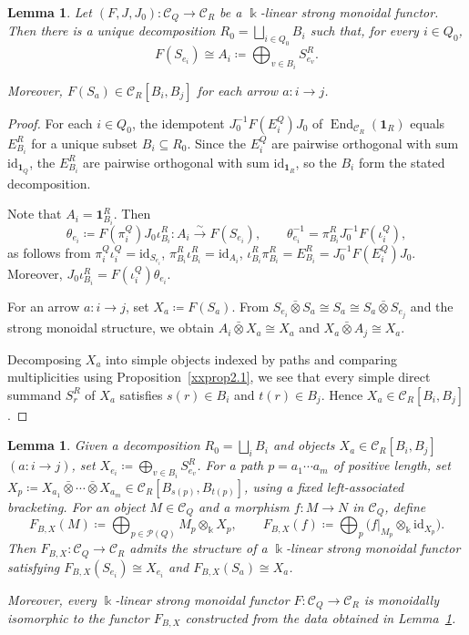 \documentclass{amsart}
\newcommand{\id}{\mathrm{id}}
\newcommand{\btensor}{\mathbin{\bar{\otimes}}}
\newtheorem{lemma}[theorem]{Lemma}
\theoremstyle{definition}
\theoremstyle{remark}
\numberwithin{equation}{section}
\begin{document}
\begin{lemma}\label{xxlem4.2}
Let
$(F,J,J_0)\colon\mathcal C_Q\longrightarrow\mathcal C_R$
be a $\Bbbk$-linear strong monoidal functor.
Then there is a unique decomposition $R_0=\bigsqcup_{i\in Q_0}B_i$
such that, for every $i\in Q_0$,
\[
F(S_{e_i})
\cong
A_i
\coloneqq
\bigoplus_{v\in B_i}S_{e_v}^R.
\]

Moreover,
$F(S_a)\in\mathcal C_R[B_i,B_j]$
for each arrow $a\colon i\to j$.

\end{lemma}

\begin{proof}
For each $i\in Q_0$, the idempotent $J_0^{-1}F(E_i^Q)J_0$ of
$\operatorname{End}_{\mathcal C_R}(\mathbf1_R)$ equals $E_{B_i}^R$ for a
unique subset $B_i\subseteq R_0$. Since the $E_i^Q$ are pairwise orthogonal
with sum $\id_{\mathbf1_Q}$, the $E_{B_i}^R$ are pairwise orthogonal with sum
$\id_{\mathbf1_R}$, so the $B_i$ form the stated decomposition.

Note that $A_i=\mathbf1_{B_i}^R$. Then
\[
\theta_{e_i}\coloneqq F(\pi_i^Q)J_0\iota_{B_i}^R
\colon A_i\xrightarrow{\sim}F(S_{e_i}),
\qquad
\theta_{e_i}^{-1}=\pi_{B_i}^R J_0^{-1}F(\iota_i^Q),
\]
as follows from $\pi_i^Q\iota_i^Q=\id_{S_{e_i}}$,
$\pi_{B_i}^R\iota_{B_i}^R=\id_{A_i}$,
$\iota_{B_i}^R\pi_{B_i}^R=E_{B_i}^R=J_0^{-1}F(E_i^Q)J_0$.
Moreover, $J_0\iota_{B_i}^R=F(\iota_i^Q)\theta_{e_i}$.

For an arrow $a\colon i\to j$, set $X_a\coloneqq F(S_a)$.
From
$S_{e_i}\btensor S_a\cong S_a\cong S_a\btensor S_{e_j}$
and the strong monoidal structure, we obtain
$A_i\btensor X_a\cong X_a$ and
$X_a\btensor A_j\cong X_a$.

Decomposing $X_a$ into simple objects indexed by paths and comparing
multiplicities using
Proposition~\ref{xxprop2.1},
we see that every simple direct summand $S_r^R$ of $X_a$ satisfies
$s(r)\in B_i$ and $t(r)\in B_j$.
Hence $X_a\in\mathcal C_R[B_i,B_j]$.
\end{proof}

\begin{lemma}\label{xxlem4.3}
Given a decomposition $R_0=\bigsqcup_iB_i$ and objects
$X_a\in\mathcal C_R[B_i,B_j]$ $(a\colon i\to j)$, set
$X_{e_i}\coloneqq\bigoplus_{v\in B_i}S_{e_v}^R$.
For a path $p=a_1\cdots a_m$ of positive length, set
$X_p\coloneqq X_{a_1}\btensor\cdots\btensor X_{a_m}
\in\mathcal C_R[B_{s(p)},B_{t(p)}]$,
using a fixed left-associated bracketing.
For an object $M\in\mathcal C_Q$ and a morphism
$f\colon M\to N$ in $\mathcal C_Q$, define
\[
F_{B,X}(M)
\coloneqq
\bigoplus_{p\in\mathcal P(Q)}M_p\otimes_{\Bbbk}X_p,
\qquad
F_{B,X}(f)
\coloneqq
\bigoplus_p
\bigl(f|_{M_p}\otimes_{\Bbbk}\id_{X_p}\bigr).
\]
Then $F_{B,X}\colon\mathcal C_Q\to\mathcal C_R$ admits the structure of a
$\Bbbk$-linear strong monoidal functor satisfying
$F_{B,X}(S_{e_i})\cong X_{e_i}$ and
$F_{B,X}(S_a)\cong X_a$.

Moreover, every $\Bbbk$-linear strong monoidal functor
$F\colon\mathcal C_Q\to\mathcal C_R$
is monoidally isomorphic to the functor
$F_{B,X}$
constructed from the data obtained in
Lemma~\ref{xxlem4.2}.
\end{lemma}
\end{document}
